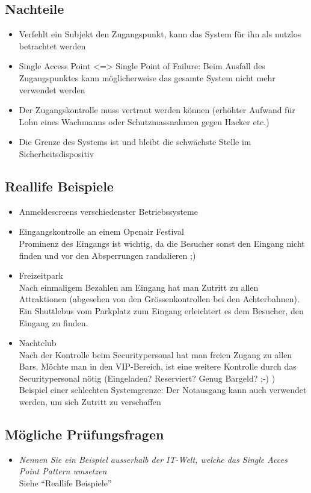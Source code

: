 \subsection*{Nachteile}
\begin{itemize}
	\item Verfehlt ein Subjekt den Zugangspunkt, kann das System für ihn als nutzlos betrachtet werden
	\item Single Access Point <=> Single Point of Failure: Beim Ausfall des Zugangspunktes kann möglicherweise das gesamte System nicht mehr verwendet werden
	\item Der Zugangskontrolle muss vertraut werden können (erhöhter Aufwand für Lohn eines Wachmanns oder Schutzmassnahmen gegen Hacker etc.)
	\item Die Grenze des Systems ist und bleibt die schwächste Stelle im Sicherheitsdispositiv
\end{itemize}

\subsection*{Reallife Beispiele}
\begin{itemize}
	\item Anmeldescreens verschiedenster Betriebssysteme
	\item Eingangskontrolle an einem Openair Festival \\
	Prominenz des Eingangs ist wichtig, da die Besucher sonst den Eingang nicht finden und vor den Absperrungen randalieren ;)
	\item Freizeitpark \\
	Nach einmaligem Bezahlen am Eingang hat man Zutritt zu allen Attraktionen (abgesehen von den Grössenkontrollen bei den Achterbahnen). Ein Shuttlebus vom Parkplatz zum Eingang erleichtert es dem Besucher, den Eingang zu finden.
	\item Nachtclub \\
	Nach der Kontrolle beim Securitypersonal hat man freien Zugang zu allen Bars. Möchte man in den VIP-Bereich, ist eine weitere Kontrolle durch das Securitypersonal nötig (Eingeladen? Reserviert? Genug Bargeld? ;-) ) \\
	Beispiel einer schlechten Systemgrenze: Der Notausgang kann auch verwendet werden, um sich Zutritt zu verschaffen
\end{itemize}

\subsection*{Mögliche Prüfungsfragen}
\begin{itemize}
	\item \emph{Nennen Sie ein Beispiel ausserhalb der IT-Welt, welche das Single Acces Point Pattern umsetzen}\\
	Siehe ``Reallife Beispiele''
\end{itemize}